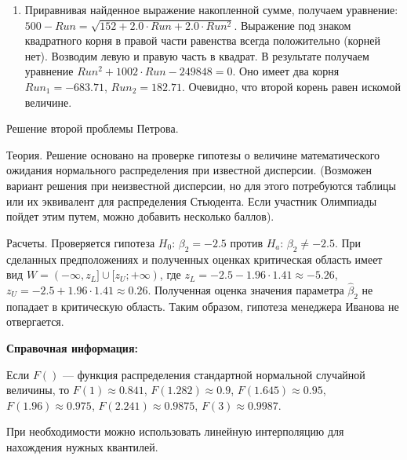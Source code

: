 \documentclass[pdftex,12pt,a4paper]{article}
\begin{document}
\begin{enumerate}
\begin{enumerate}
\item  Приравнивая найденное выражение накопленной сумме, получаем уравнение:
$500- Run= \sqrt{152+2.0\cdot Run+2.0\cdot Run^{2} } $.  Выражение под знаком квадратного корня в правой части равенства всегда положительно (корней нет). Возводим левую и правую часть в квадрат. В результате получаем уравнение $Run^{2} +1002\cdot Run-249848=0$. Оно имеет два корня $Run_1= -683.71$, $Run_2=182.71$. Очевидно, что второй корень равен искомой величине.

\end{enumerate}

Решение второй проблемы Петрова.


Теория. Решение основано на проверке гипотезы о величине математического ожидания нормального распределения при известной дисперсии. (Возможен вариант решения при неизвестной дисперсии, но для этого потребуются таблицы или их эквивалент для распределения Стьюдента. Если участник Олимпиады пойдет этим путем, можно добавить несколько баллов).  


Расчеты.  Проверяется гипотеза $H_0$: $\beta_2=-2.5$ против $H_a$: $\beta_2 \neq -2.5$. При сделанных предположениях и полученных оценках критическая область имеет вид $W=(-\infty,z_L]\cup [z_U;+\infty)$, где $z_L=-2.5-1.96\cdot 1.41\approx -5.26$, $z_U=-2.5+1.96\cdot 1.41\approx 0.26$.  Полученная оценка значения параметра  $\hat{\beta}_2$ не попадает в критическую область. Таким образом, гипотеза менеджера Иванова не отвергается.


\end{enumerate}

\vspace{30pt}

\textbf{Справочная информация:} 

\vspace{6pt}

Если $F()$ --- функция распределения стандартной нормальной случайной величины, то $F(1)\approx 0.841$, $F(1.282)\approx 0.9$, $F(1.645)\approx 0.95$, $F(1.96)\approx 0.975$, $F(2.241)\approx 0.9875$, $F(3)\approx 0.9987$.

При необходимости можно использовать линейную интерполяцию для нахождения нужных квантилей.
\end{document}
